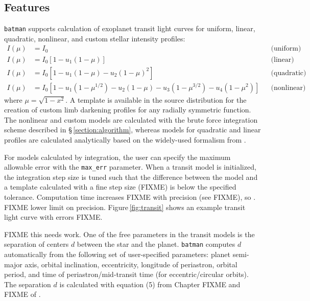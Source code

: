 \documentclass[12pt,preprint]{aastex}
\begin{document}
\subsection{Features}
\texttt{batman} supports calculation of exoplanet transit light curves for uniform, linear, quadratic, nonlinear, and custom stellar intensity profiles:
\begin{align}
  I(\mu) &= I_0                                                                         & &\text{(uniform)}             \\
  I(\mu) &= I_0[1 - u_1(1-\mu)]                                                         & &\text{(linear)}              \\
  I(\mu) &= I_0[1 - u_1(1 - \mu) - u_2(1-\mu)^2]                                        & &\text{(quadratic)}           \\
  I(\mu) &= I_0[1 - u_1(1-\mu^{1/2}) - u_2(1- \mu) - u_3(1-\mu^{3/2}) - u_4(1-\mu^2)]   & &\text{(nonlinear)}
\end{align}
where $\mu = \sqrt{1-x^2}$.  A template is available in the source distribution for the creation of custom limb darkening profiles for any radially symmetric function.  The nonlinear and custom models are calculated with the brute force integration scheme described in \S\,\ref{section:algorithm}, whereas models for quadratic and linear profiles are calculated analytically based on the widely-used formalism from \cite{mandel02}.  

For models calculated by integration, the user can specify the maximum allowable error with the \texttt{max\_err} parameter.  When a transit model is initialized, the integration step size is tuned such that the difference between the model and a template calculated with a fine step size (FIXME) is below the specified tolerance.  Computation time increases FIXME with precision (see FIXME), so .  FIXME lower limit on precision. Figure\,\ref{fig:transit} shows an example transit light curve with errors FIXME.


FIXME this needs work. One of the free parameters in the transit models is the separation of centers $d$ between the star and the planet.  \texttt{batman} computes $d$ automatically from the following set of user-specified parameters: planet semi-major axis, orbital inclination, eccentricity, longitude of periastron, orbital period, and time of periastron/mid-transit time (for eccentric/circular orbits). The separation $d$ is calculated with equation (5) from Chapter FIXME and FIXME of \citep{seager10}. 
\end{document}
